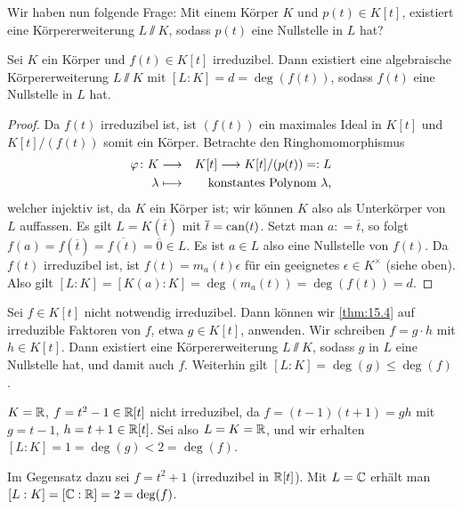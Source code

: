 \documentclass[12pt,a4paper]{scrartcl}
\begin{document}
Wir haben nun folgende Frage: Mit einem Körper $K$ und $p(t)\in K[t]$, existiert eine Körpererweiterung $L\sslash K$, sodass $p(t)$ eine Nullstelle in $L$ hat?

\begin{satz} \label{thm:15.4}
	Sei $K$ ein Körper und $f(t)\in K[t]$ irreduzibel. Dann existiert eine algebraische Körpererweiterung $L\sslash K$ mit $[L:K]  = d = \deg(f(t))$, sodass $f(t)$ eine Nullstelle in $L$ hat.
\end{satz}
\begin{proof}
	Da $f(t)$ irreduzibel ist, ist $(f(t))$ ein maximales Ideal in $K[t]$ und $K[t]/(f(t))$ somit ein Körper. Betrachte den Ringhomomorphismus 
	\begin{eqnarray*}
	\varphi\colon K&\longrightarrow& K[t]\longrightarrow K[t]/(p(t)) = : L\\
	\lambda &\longmapsto & \text{konstantes Polynom $\lambda$},
	\end{eqnarray*}
	welcher injektiv ist, da $K$ ein Körper ist; wir können $K$ also als Unterkörper von $L$ auffassen. Es gilt $L = K(\overline{t})$ mit $\overline{t}  = \operatorname{can} (t)$. Setzt man $a: = \overline{t}$, so folgt $f(a) = f(\overline{t}) = \overline{f(t)} = \overline{0}\in L$. Es ist $a\in L$ also eine Nullstelle von $f(t)$. Da $f(t)$ irreduzibel ist, ist $f(t) = m_a(t)\epsilon$ für ein geeignetes $\epsilon \in K^{\times}$ (siehe oben). Also gilt $[L:K] = [K(a):K] = \deg(m_a(t)) = \deg(f(t)) = d$.
\end{proof}	



\begin{bem}
	Sei $f\in K[t]$ nicht notwendig irreduzibel. Dann können wir \cref{thm:15.4} auf irreduzible Faktoren von $f$, etwa $g\in K[t]$, anwenden. Wir schreiben $f = g\cdot h$ mit $h \in K[t]$. Dann existiert eine Körpererweiterung $L\sslash K$, sodass $g$ in $L$ eine Nullstelle hat, und damit auch $f$. Weiterhin gilt $[L:K] = \deg(g)\leq \deg (f)$.
\end{bem}
\begin{bsp} $K = \mathbb R$, $f= t^2-1\in \mathbb R[t]$ nicht irreduzibel, da $f = (t-1)(t+1) = gh$ mit $g = t-1$, $h = t+1\in\mathbb R[t]$. Sei also $L = K = \mathbb R$, und wir erhalten $[L:K] = 1 = \deg(g)<2 = \deg(f)$.

Im Gegensatz dazu sei $f = t^2+1$ (irreduzibel in $\mathbb R[t]$). Mit $L =\mathbb C$ erhält man $[L:K] = [\mathbb C:\mathbb R] = 2 = \deg(f)$.
\end{bsp}
	
\end{document}
